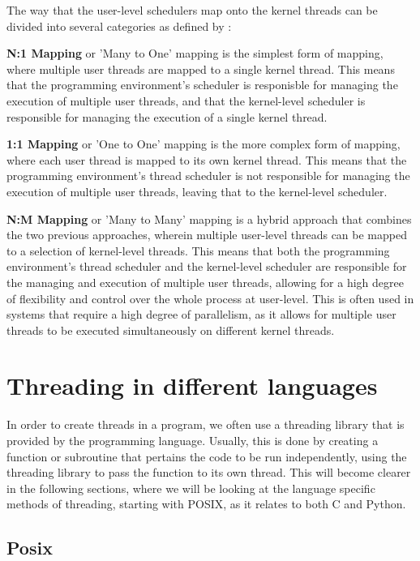 \documentclass[12pt,a4paper]{article}
\begin{document}
The way that the user-level schedulers map onto the kernel threads can be divided into several categories as defined by \citeauthor[pp. 155-156]{Rauber2023}:

\textbf{N:1 Mapping} or 'Many to One' mapping is the simplest form of mapping, where multiple user threads are mapped to a single kernel thread. This means that the programming environment's scheduler is responisble for managing the execution of multiple user threads, and that the kernel-level scheduler is responsible for managing the execution of a single kernel thread.

\textbf{1:1 Mapping} or 'One to One' mapping is the more complex form of mapping, where each user thread is mapped to its own kernel thread. This means that the programming environment's thread scheduler is not responsible for managing the execution of multiple user threads, leaving that to the kernel-level scheduler.

\textbf{N:M Mapping} or 'Many to Many' mapping is a hybrid approach that combines the two previous approaches, wherein multiple user-level threads can be mapped to a selection of kernel-level threads. This means that both the programming environment's thread scheduler and the kernel-level scheduler are responsible for the managing and execution of multiple user threads, allowing for a high degree of flexibility and control over the whole process at user-level. This is often used in systems that require a high degree of parallelism, as it allows for multiple user threads to be executed simultaneously on different kernel threads.

\section{Threading in different languages}

In order to create threads in a program, we often use a threading library that is provided by the programming language. Usually, this is done by creating a function or subroutine that pertains the code to be run independently, using the threading library to pass the function to its own thread. This will become clearer in the following sections, where we will be looking at the language specific methods of threading, starting with POSIX, as it relates to both C and Python.

\subsection{Posix}
\end{document}
